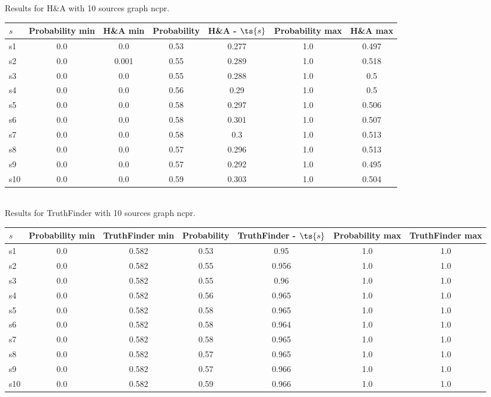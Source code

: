 \documentclass{article}
\begin{document}
\noindent Results for H\&A with 10 sources graph ncpr.

\noindent\begin{tabular}{|l|c|c|c|c|c|c|}
\hline
$s$& Probability min & H\&A min & Probability & H\&A - $\ts{s}$ & Probability max & H\&A max\\
\hline
s1 &0.0 & 0.0 & 0.53 & 0.277 & 1.0 & 0.497\\
\hline
s2 &0.0 & 0.001 & 0.55 & 0.289 & 1.0 & 0.518\\
\hline
s3 &0.0 & 0.0 & 0.55 & 0.288 & 1.0 & 0.5\\
\hline
s4 &0.0 & 0.0 & 0.56 & 0.29 & 1.0 & 0.5\\
\hline
s5 &0.0 & 0.0 & 0.58 & 0.297 & 1.0 & 0.506\\
\hline
s6 &0.0 & 0.0 & 0.58 & 0.301 & 1.0 & 0.507\\
\hline
s7 &0.0 & 0.0 & 0.58 & 0.3 & 1.0 & 0.513\\
\hline
s8 &0.0 & 0.0 & 0.57 & 0.296 & 1.0 & 0.513\\
\hline
s9 &0.0 & 0.0 & 0.57 & 0.292 & 1.0 & 0.495\\
\hline
s10 &0.0 & 0.0 & 0.59 & 0.303 & 1.0 & 0.504\\
\hline
\end{tabular}\\

\noindent Results for TruthFinder with 10 sources graph ncpr.

\noindent\begin{tabular}{|l|c|c|c|c|c|c|}
\hline
$s$& Probability min & TruthFinder min & Probability & TruthFinder - $\ts{s}$ & Probability max & TruthFinder max\\
\hline
s1 &0.0 & 0.582 & 0.53 & 0.95 & 1.0 & 1.0\\
\hline
s2 &0.0 & 0.582 & 0.55 & 0.956 & 1.0 & 1.0\\
\hline
s3 &0.0 & 0.582 & 0.55 & 0.96 & 1.0 & 1.0\\
\hline
s4 &0.0 & 0.582 & 0.56 & 0.965 & 1.0 & 1.0\\
\hline
s5 &0.0 & 0.582 & 0.58 & 0.965 & 1.0 & 1.0\\
\hline
s6 &0.0 & 0.582 & 0.58 & 0.964 & 1.0 & 1.0\\
\hline
s7 &0.0 & 0.582 & 0.58 & 0.965 & 1.0 & 1.0\\
\hline
s8 &0.0 & 0.582 & 0.57 & 0.965 & 1.0 & 1.0\\
\hline
s9 &0.0 & 0.582 & 0.57 & 0.966 & 1.0 & 1.0\\
\hline
s10 &0.0 & 0.582 & 0.59 & 0.966 & 1.0 & 1.0\\
\hline
\end{tabular}\\
\end{document}
